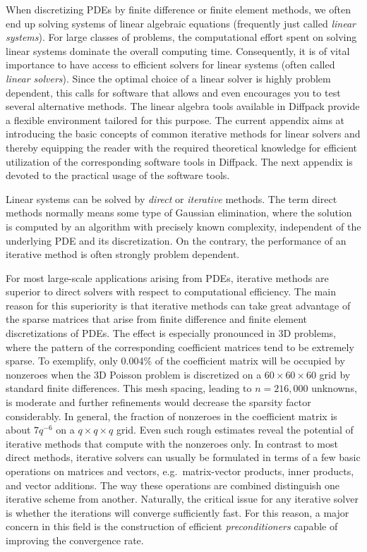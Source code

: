 



When discretizing PDEs by finite difference or finite element methods,
we often end up solving systems of linear algebraic equations
(frequently just called \emph{linear systems}).  For large classes of
problems, the computational effort spent on solving linear systems
dominate the overall computing time.  Consequently, it is of vital
importance to have access to efficient solvers for linear systems
(often called \emph{linear solvers}).  Since the optimal choice of a
linear solver is highly problem dependent, this calls for software
that allows and even encourages you to test several alternative
methods. The linear algebra tools available in Diffpack provide a
flexible environment tailored for this purpose.  The current appendix
aims at introducing the basic concepts of common iterative methods for
linear solvers and thereby equipping the reader with the required
theoretical knowledge for efficient utilization of the corresponding
software tools in Diffpack.  The next appendix is devoted to the
practical usage of the software tools.

Linear systems can be solved by \emph{direct} or \emph{iterative} methods.
The term direct methods normally means some type of Gaussian elimination, where
the solution is computed by an algorithm with precisely known
complexity, independent of the underlying PDE and its
discretization. On the contrary, the performance of an iterative method
is often strongly problem dependent.

For most large-scale applications arising from PDEs, iterative methods
are superior to direct solvers with respect to computational
efficiency.  The main reason for this superiority is that iterative
methods can take great advantage of the sparse matrices that arise
from finite difference and finite element discretizations of PDEs.
The effect is especially pronounced in 3D problems, where the pattern
of the corresponding coefficient matrices tend to be extremely
sparse. To exemplify, only 0.004\%{} of the coefficient matrix will be
occupied by nonzeroes when the 3D Poisson
problem %
is discretized on a $60 \times 60 \times 60$ grid by standard finite
differences. This mesh spacing, leading to $n=216,000$ unknowns, is
moderate and further refinements would decrease the sparsity factor
considerably. In general, the fraction of nonzeroes in the coefficient
matrix is about $7q^{-6}$ on a $q\times q\times q$ grid.  Even such
rough estimates reveal the potential of iterative methods that compute
with the nonzeroes only.  In contrast to most direct methods,
iterative solvers can usually be formulated in terms of a few basic
operations on matrices and vectors, e.g.\ matrix-vector products,
inner products, and vector additions. The way these operations are
combined distinguish one iterative scheme from another.  Naturally,
the critical issue for any iterative solver is whether the iterations
will converge sufficiently fast. For this reason, a major concern in
this field is the construction of efficient \emph{preconditioners}
capable of improving the convergence rate.

